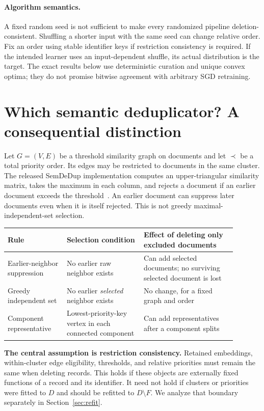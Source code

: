 \documentclass[11pt,a4paper]{article}
\theoremstyle{definition}\newtheorem{definition}[theorem]{Definition}
\newcommand{\minus}{\setminus}
\begin{document}
\paragraph{Algorithm semantics.} A fixed random seed is not sufficient to make every randomized pipeline deletion-consistent. Shuffling a shorter input with the same seed can change relative order. Fix an order using stable identifier keys if restriction consistency is required. If the intended learner uses an input-dependent shuffle, its actual distribution is the target. The exact results below use deterministic curation and unique convex optima; they do not promise bitwise agreement with arbitrary SGD retraining.

\section{Which semantic deduplicator? A consequential distinction}
Let $G=(V,E)$ be a threshold similarity graph on documents and let $\prec$ be a total priority order. Its edges may be restricted to documents in the same cluster. The released SemDeDup implementation computes an upper-triangular similarity matrix, takes the maximum in each column, and rejects a document if an earlier document exceeds the threshold~\cite{semdedup,semcode}. An earlier document can suppress later documents even when it is itself rejected. This is not greedy maximal-independent-set selection.

\begin{center}\small
\begin{tabular}{p{0.23\linewidth}p{0.30\linewidth}p{0.36\linewidth}}
\toprule
Rule & Selection condition & Effect of deleting only excluded documents\\
\midrule
Earlier-neighbor suppression & No earlier raw neighbor exists & Can add selected documents; no surviving selected document is lost\\
Greedy independent set & No earlier \emph{selected} neighbor exists & No change, for a fixed graph and order\\
Component representative & Lowest-priority-key vertex in each connected component & Can add representatives after a component splits\\
\bottomrule
\end{tabular}
\end{center}

\textbf{The central assumption is restriction consistency.} Retained embeddings, within-cluster edge eligibility, thresholds, and relative priorities must remain the same when deleting records. This holds if these objects are externally fixed functions of a record and its identifier. It need not hold if clusters or priorities were fitted to $D$ and should be refitted to $D\minus F$. We analyze that boundary separately in Section~\ref{sec:refit}.
\end{document}

